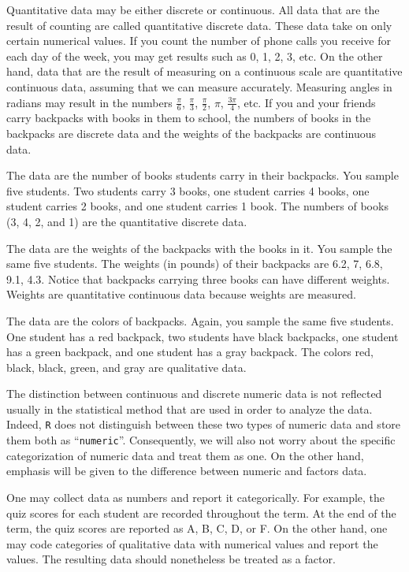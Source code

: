 \documentclass[]{krantz}
\theoremstyle{definition}
\theoremstyle{definition}
\theoremstyle{definition}
\theoremstyle{remark}
\begin{document}
Quantitative data may be either discrete or continuous. All data that
are the result of counting are called quantitative discrete data. These
data take on only certain numerical values. If you count the number of
phone calls you receive for each day of the week, you may get results
such as 0, 1, 2, 3, etc. On the other hand, data that are the result of
measuring on a continuous scale are quantitative continuous data,
assuming that we can measure accurately. Measuring angles in radians may
result in the numbers \(\frac{\pi}{6}\), \(\frac{\pi}{3}\), \(\frac{\pi}{2}\),
\(\pi\), \(\frac{3\pi}{4}\), etc. If you and your friends carry backpacks
with books in them to school, the numbers of books in the backpacks are
discrete data and the weights of the backpacks are continuous data.

The data are the number of books students carry in their backpacks. You
sample five students. Two students carry 3 books, one student carries 4
books, one student carries 2 books, and one student carries 1 book. The
numbers of books (3, 4, 2, and 1) are the quantitative discrete data.

The data are the weights of the backpacks with the books in it. You
sample the same five students. The weights (in pounds) of their
backpacks are 6.2, 7, 6.8, 9.1, 4.3. Notice that backpacks carrying
three books can have different weights. Weights are quantitative
continuous data because weights are measured.

The data are the colors of backpacks. Again, you sample the same five
students. One student has a red backpack, two students have black
backpacks, one student has a green backpack, and one student has a gray
backpack. The colors red, black, black, green, and gray are qualitative
data.

The distinction between continuous and discrete numeric data is not
reflected usually in the statistical method that are used in order to
analyze the data. Indeed, \texttt{R} does not distinguish between these two
types of numeric data and store them both as ``\texttt{numeric}''. Consequently,
we will also not worry about the specific categorization of numeric data
and treat them as one. On the other hand, emphasis will be given to the
difference between numeric and factors data.

One may collect data as numbers and report it categorically. For
example, the quiz scores for each student are recorded throughout the
term. At the end of the term, the quiz scores are reported as A, B, C,
D, or F. On the other hand, one may code categories of qualitative data
with numerical values and report the values. The resulting data should
nonetheless be treated as a factor.
\end{document}
